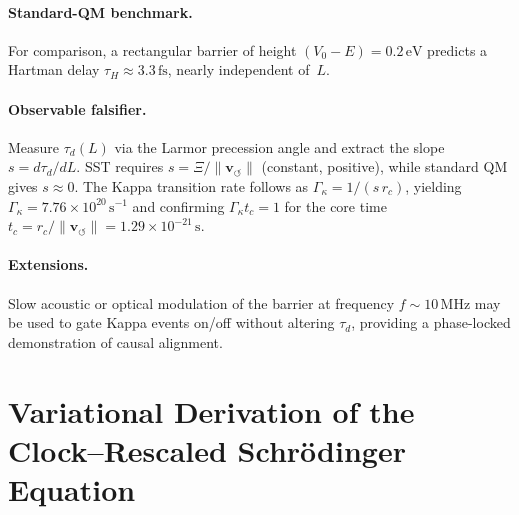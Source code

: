 \documentclass[10pt,reprint,aps,onecolumn,nofootinbib]{revtex4-2}
\begin{document}
    \paragraph{Standard-QM benchmark.}
    For comparison, a rectangular barrier of height $(V_0-E) = 0.2\,\mathrm{eV}$ predicts a Hartman delay $\tau_H \approx 3.3\,\mathrm{fs}$, nearly independent of~$L$.

    \paragraph{Observable falsifier.}
    Measure $\tau_d(L)$ via the Larmor precession angle and extract the slope $s = d\tau_d/dL$. SST requires $s = \Xi/\lVert\mathbf{v}_{\!\boldsymbol{\circlearrowleft}}\rVert$ (constant, positive), while standard QM gives $s \approx 0$. The Kappa transition rate follows as $\Gamma_\kappa = 1/(s\,r_c)$, yielding $\Gamma_\kappa = 7.76\times10^{20}\,\mathrm{s^{-1}}$ and confirming $\Gamma_\kappa t_c = 1$ for the core time $t_c = r_c/\lVert\mathbf{v}_{\!\boldsymbol{\circlearrowleft}}\rVert = 1.29\times10^{-21}\,\mathrm{s}$.

    \paragraph{Extensions.}
    Slow acoustic or optical modulation of the barrier at frequency $f \sim 10\,\mathrm{MHz}$ may be used to gate Kappa events on/off without altering $\tau_d$, providing a phase-locked demonstration of causal alignment.


\section{Variational Derivation of the Clock–Rescaled Schrödinger Equation}
\label{app:swirlclock-derivation}
\end{document}
